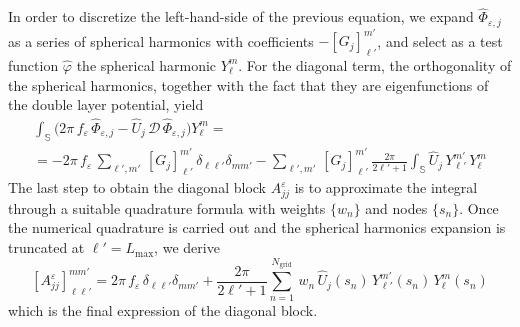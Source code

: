 In order to discretize the left-hand-side of the previous equation, we expand $\hat{\Phi}_{\varepsilon,j}$ as a series of spherical harmonics with coefficients $-[G_j]_{\ell'}^{m'}$, and select as a test function $\hat{\varphi}$  the spherical harmonic $Y_{\ell}^{m}$. For the diagonal term, the orthogonality of the spherical harmonics, together with the fact that they are eigenfunctions of the double layer potential, yield
\begin{multline*}
 \int_{\mathbb{S}}\big( 2\pi \, f_\varepsilon \, \hat{\Phi}_{\varepsilon,j} - \hat{U}_j \, {\mathcal{D}} \, \hat{\Phi}_{\varepsilon,j} \big) Y_\ell^m = \\
= - 2 \pi  \, f_\varepsilon \, \sum_{\ell',m'}  \, [G_j]_{\ell'}^{m'} \, \delta_{\ell \ell'} \delta_{mm'}  - \sum_{\ell',m'} \, [G_j]_{\ell'}^{m'} \, \frac{2\pi}{2\ell'+1} \int_{\mathbb{S}} \hat{U}_j \,  Y_{\ell'}^{m'}\, Y_\ell^m
\end{multline*}
The last step to obtain the diagonal block $A_{jj}^\varepsilon$ is to approximate the integral through a suitable quadrature formula with weights $\{w_n\}$ and nodes $\{ s_n\}$. Once the numerical quadrature is carried out and the spherical harmonics expansion is truncated at $\ell' = L_\text{max}$, we derive
\begin{equation}\label{eq:ajj}
[A_{jj}^\varepsilon]_{\ell \ell'}^{mm'} = 2\pi \, f_\varepsilon %
 \,  \delta_{\ell \ell'} \delta_{mm'} + \frac{2\pi}{2\ell'+1} \sum_{n=1}^{N_\text{grid}} \, w_n \, \hat{U}_j(s_n)  \, Y_{\ell'}^{m'}(s_n)\,  Y_\ell^m(s_n)
\end{equation}
which is the final expression of the diagonal block.

